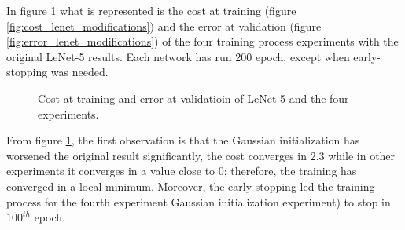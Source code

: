 
In figure \ref{fig:LenetModifications} what is represented is the cost at training (figure \ref{fig:cost_lenet_modifications}) and the error at validation (figure \ref{fig:error_lenet_modifications}) of the four training process experiments  with the original LeNet-5 results. Each network has run 200 epoch, except when early-stopping was needed.
\begin{figure}[tb]    \centering
    \caption{Cost at training and error at validatioin of LeNet-5 and the four experiments.} \label{fig:LenetModifications}
\end{figure}

From figure \ref{fig:LenetModifications}, the first observation is that the Gaussian initialization has worsened the original result significantly, the cost converges in 2.3 while in other experiments it converges in a value close to 0; therefore, the training has converged in a local minimum. Moreover, the early-stopping led the training process for the fourth experiment Gaussian initialization experiment) to stop in $100^{th}$ epoch.\\

